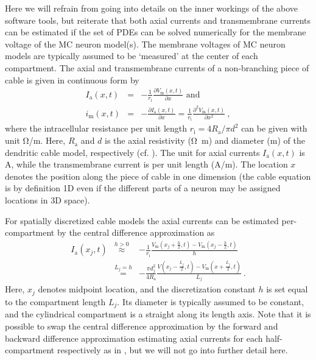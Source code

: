 Here we will refrain from going into details on the inner workings of the above software tools, 
but reiterate that both axial currents and transmembrane currents can be estimated if the set of PDEs can be solved numerically for the membrane voltage of the MC neuron model(s). 
The membrane voltages of MC neuron models are typically assumed to be `measured' at the center of each compartment. 
The axial and transmembrane currents of a non-branching piece of cable is given in continuous form by 
%
\begin{eqnarray}
I_\mathrm{a}(x,t) &=& - \frac{1}{r_\mathrm{i}} \frac{\partial V_\mathrm{m}(x, t)}{\partial x} \text{~and} \\
i_\mathrm{m}(x, t) &=& - \frac{\partial I_\mathrm{a} (x, t)}{\partial x} = \frac{1}{r_\mathrm{i}} \frac{\partial^2 V_\mathrm{m}(x,t)}{\partial x^2}~,
\label{eq:LFPy_ia_im_continuous}
\end{eqnarray}
%
where the intracellular resistance per unit length $r_\mathrm{i}=4R_\mathrm{a}/\pi d^2$ can be given with unit \si{\ohm/\metre}. 
Here, $R_\mathrm{a}$  and $d$ is the axial resistivity (\si{\ohm\metre}) and diameter (\si{\metre}) of the dendritic cable model, respectively (cf. ).  
The unit for axial currents $I_\mathrm{a}(x, t)$ is \si{\ampere}, 
while the transmembrane current is per unit length (\si{\ampere/\metre}).
The location $x$ denotes the position along the piece of cable in one dimension (the cable equation is by definition 1D even if the different parts of a neuron may be assigned locations in 3D space). 

For spatially discretized cable models the axial currents can be estimated per-compartment by the central difference approximation as
%
\begin{eqnarray}
I_\mathrm{a}(x_j, t) &\overset{h>0}{\approx}& - \frac{1}{r_\mathrm{i}} \frac{V_\mathrm{m}(x_j+\frac{h}{2}, t) - V_\mathrm{m}(x_j-\frac{h}{2}, t)}{h} \nonumber \\
		  &\overset{L_j=h}{=}& - \frac{\pi d_j^2}{4 R_\mathrm{a}} \frac{V(x_j - \frac{L_j}{2}, t) - V_\mathrm{m}(x + \frac{L_j}{2}, t)}{L_j} ~.
\label{eq:LFPy_ia_discrete}
\end{eqnarray}
%
Here, $x_j$ denotes midpoint location,
and the discretization constant $h$ is set equal to the compartment length $L_j$. 
Its diameter is typically assumed to be constant, 
and the cylindrical compartment is a straight along its length axis. 
Note that it is possible to swap the central difference approximation 
by the forward and  backward difference approximation estimating axial currents for each half-compartment respectively as in \cite{Hagen2018}, 
but we will not go into further detail here. 
 
